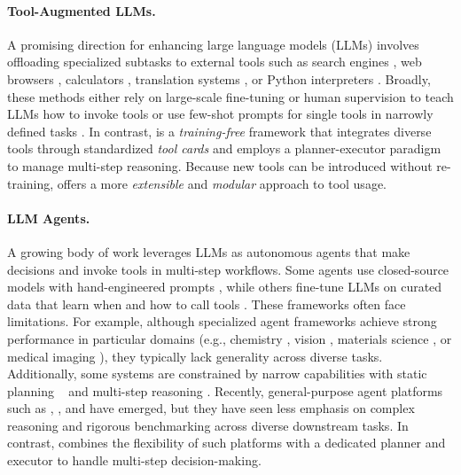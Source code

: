 \paragraph{Tool-Augmented LLMs.}
A promising direction for enhancing large language models (LLMs) involves offloading specialized subtasks to external tools such as search engines \citep{komeili-etal-2022-internet, thoppilan2022lamda, lazaridou2022internet, shuster2022blenderbot, yao2022react}, web browsers \citep{nakano2021webgpt}, calculators \citep{cobbe2021training, thoppilan2022lamda}, translation systems \citep{thoppilan2022lamda}, or Python interpreters \citep{gao2023pal}. Broadly, these methods either rely on large-scale fine-tuning or human supervision to teach LLMs how to invoke tools \citep{schick2023toolformer, komeili-etal-2022-internet, nakano2021webgpt, thoppilan2022lamda} or use few-shot prompts for single tools in narrowly defined tasks \citep{yao2022react, lazaridou2022internet, gao2023pal}. In contrast, \model is a \emph{training-free} framework that integrates diverse tools through standardized \emph{tool cards} and employs a planner-executor paradigm to manage multi-step reasoning. Because new tools can be introduced without re-training, \model offers a more \emph{extensible} and \emph{modular} approach to tool usage. 

\paragraph{LLM Agents.} A growing body of work leverages LLMs as autonomous agents that make decisions and invoke tools in multi-step workflows. Some agents use closed-source models with hand-engineered prompts \citep{chen2023llava, wang2024mobile}, while others fine-tune LLMs on curated data that learn when and how to call tools \cite{liu2023llava, tao2023webwise, zhang2024toolbehonest}. These frameworks often face limitations. For example, although specialized agent frameworks achieve strong performance in particular domains (e.g., chemistry \citep{bran2023chemcrow}, vision \citep{li2024mmedagent, hu2024visual}, materials science \citep{kang2024chatmof}, or medical imaging \citep{schmidgall2024agentclinic}), they typically lack generality across diverse tasks. Additionally, some systems are constrained by narrow capabilities with static planning ~\cite{lu2023chameleon} and multi-step reasoning \citep{hu2024visual}. Recently, general-purpose agent platforms such as \autogen \citep{autogen}, \gptplugin \citep{gpt4oplugin}, and \langchain \citep{langchain} have emerged, but they have seen less emphasis on complex reasoning and rigorous benchmarking across diverse downstream tasks. In contrast, \model combines the flexibility of such platforms with a dedicated planner and executor to handle multi-step decision-making. 


